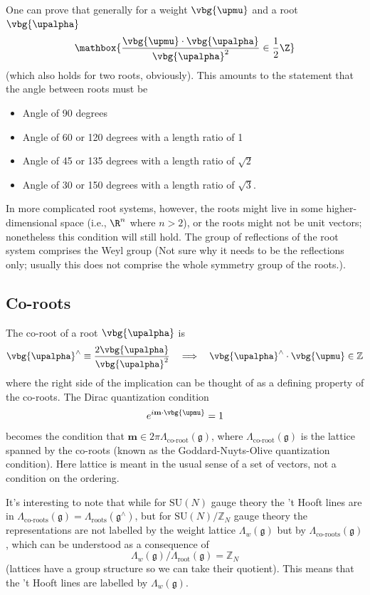 \documentclass{report}
\begin{document}
 One can prove that generally for a weight $
\vbg{\upmu} $ and a root $ \vbg{\upalpha} $ \begin{equation*}
	\mathbox{\frac{\vbg{\upmu}\cdot\vbg{\upalpha}}{\vbg{\upalpha}^2}
		\in \frac{1}{2}\Z}
\end{equation*}	
(which also holds for two roots, obviously). This amounts to the statement that
the angle between roots must be 
\begin{itemize}
\itemsep0em
\item Angle of 90 degrees 
\item Angle of 60 or 120 degrees with a length ratio of 1 
\item Angle of 45 or 135 degrees with a length ratio of $ \sqrt{2} $ 
\item Angle of 30 or 150 degrees with a length ratio of $ \sqrt{3} $.
\end{itemize}
In more complicated 
root systems, however, the roots might live in some higher-dimensional space 
(i.e., $ \R^n $ where $ n > 2$), or the roots might not be unit vectors;
nonetheless this condition will still hold. The group of reflections of the 
root system comprises the Weyl group {\color{myred} (Not sure why it needs to 
be the reflections only; usually this does not comprise the whole symmetry 
group of the roots.)}. 

\subsection{Co-roots}
The co-root of a root $ \vbg{\upalpha} $ is 
\begin{equation*}
	\vbg{\upalpha}^\wedge \equiv \frac{2\vbg{\upalpha}}{\vbg{\upalpha}^2}
	\quad 
	\Longrightarrow 
	\quad 
	\vbg{\upalpha}^\wedge \cdot \vbg{\upmu} \in \mathbb{Z}
\end{equation*}
where the right side of the implication can be thought of as a defining 
property of the co-roots. The Dirac quantization condition 
\begin{align*}
	e^{i\mathbf{m}\cdot \vbg{\upmu}} = 1 
\end{align*}
becomes the condition that $ \mathbf{m} \in 2\pi
\Lambda_{\text{co-root}}(\mathfrak{g}) $, where $
\Lambda_{\text{co-root}}(\mathfrak{g}) $ is the lattice spanned by the co-roots 
(known as the Goddard-Nuyts-Olive quantization condition). Here lattice 
is meant in the usual sense of a set of vectors, not a condition on the ordering.  

It's interesting to note that while for $ \text{SU}(N) $ gauge theory 
the 't Hooft lines are in $\Lambda_{\text{co-roots}}(\mathfrak{g}) = 
\Lambda_{\text{roots}}(\mathfrak{g}^\wedge)$, but for $ \text{SU}(N)/\mathbb{Z}_N $
gauge theory the representations are not labelled by the weight lattice 
$ \Lambda_w(\mathfrak{g}) $ but by $ \Lambda_{\text{co-roots}}(\mathfrak{g}) $,
which can be understood as a consequence of  
\begin{equation*}
	\Lambda_w(\mathfrak{g})/\Lambda_{\text{root}}(\mathfrak{g}) = \mathbb{Z}_N
\end{equation*}
(lattices have a group structure so we can take their quotient). 
This means that the 't Hooft lines 
are labelled by $ \Lambda_w(\mathfrak{g}) $.
\end{document}
